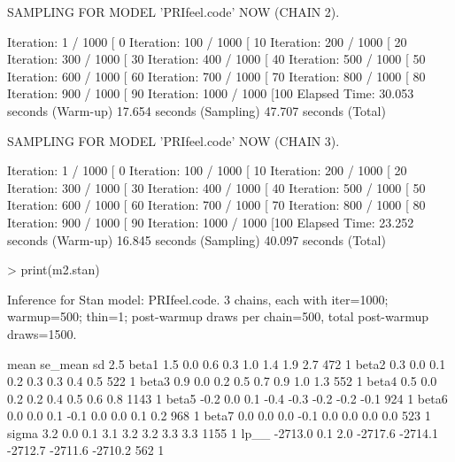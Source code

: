 \documentclass[12pt]{article}
\begin{document}
\begin{enumerate}
\begin{Schunk}
\begin{Soutput}
SAMPLING FOR MODEL 'PRIfeel.code' NOW (CHAIN 2).

Iteration:   1 / 1000 [  0%
Iteration: 100 / 1000 [ 10%
Iteration: 200 / 1000 [ 20%
Iteration: 300 / 1000 [ 30%
Iteration: 400 / 1000 [ 40%
Iteration: 500 / 1000 [ 50%
Iteration: 600 / 1000 [ 60%
Iteration: 700 / 1000 [ 70%
Iteration: 800 / 1000 [ 80%
Iteration: 900 / 1000 [ 90%
Iteration: 1000 / 1000 [100%
Elapsed Time: 30.053 seconds (Warm-up)
              17.654 seconds (Sampling)
              47.707 seconds (Total)

SAMPLING FOR MODEL 'PRIfeel.code' NOW (CHAIN 3).

Iteration:   1 / 1000 [  0%
Iteration: 100 / 1000 [ 10%
Iteration: 200 / 1000 [ 20%
Iteration: 300 / 1000 [ 30%
Iteration: 400 / 1000 [ 40%
Iteration: 500 / 1000 [ 50%
Iteration: 600 / 1000 [ 60%
Iteration: 700 / 1000 [ 70%
Iteration: 800 / 1000 [ 80%
Iteration: 900 / 1000 [ 90%
Iteration: 1000 / 1000 [100%
Elapsed Time: 23.252 seconds (Warm-up)
              16.845 seconds (Sampling)
              40.097 seconds (Total)
\end{Soutput}
\begin{Sinput}
> print(m2.stan)
\end{Sinput}
\begin{Soutput}
Inference for Stan model: PRIfeel.code.
3 chains, each with iter=1000; warmup=500; thin=1; 
post-warmup draws per chain=500, total post-warmup draws=1500.

         mean se_mean  sd    2.5%
beta1     1.5     0.0 0.6     0.3     1.0     1.4     1.9     2.7   472    1
beta2     0.3     0.0 0.1     0.2     0.3     0.3     0.4     0.5   522    1
beta3     0.9     0.0 0.2     0.5     0.7     0.9     1.0     1.3   552    1
beta4     0.5     0.0 0.2     0.2     0.4     0.5     0.6     0.8  1143    1
beta5    -0.2     0.0 0.1    -0.4    -0.3    -0.2    -0.2    -0.1   924    1
beta6     0.0     0.0 0.1    -0.1     0.0     0.0     0.1     0.2   968    1
beta7     0.0     0.0 0.0    -0.1     0.0     0.0     0.0     0.0   523    1
sigma     3.2     0.0 0.1     3.1     3.2     3.2     3.3     3.3  1155    1
lp__  -2713.0     0.1 2.0 -2717.6 -2714.1 -2712.7 -2711.6 -2710.2   562    1


\end{Soutput}
\end{Schunk}
\end{enumerate}
\end{document}

